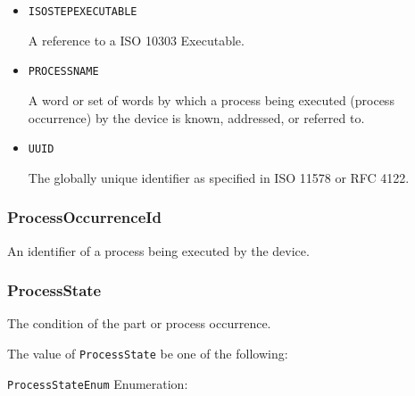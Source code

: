 \begin{itemize}

\item \texttt{ISO\textunderscore STEP\textunderscore EXECUTABLE}


A reference to a ISO 10303 Executable.

\item \texttt{PROCESS\textunderscore NAME}


A word or set of words by which a process being executed (process occurrence) by the device is known, addressed, or referred to.


\item \texttt{UUID}


The globally unique identifier as specified in ISO 11578 or RFC 4122.


\end{itemize}






\subsubsection{ProcessOccurrenceId}
\label{sec:ProcessOccurrenceId}



An identifier of a process being executed by the device.



\subsubsection{ProcessState}
\label{sec:ProcessState}



The condition of the part or process occurrence.


The value of \texttt{ProcessState} \MUST be one of the following: 


\texttt{ProcessStateEnum} Enumeration:

